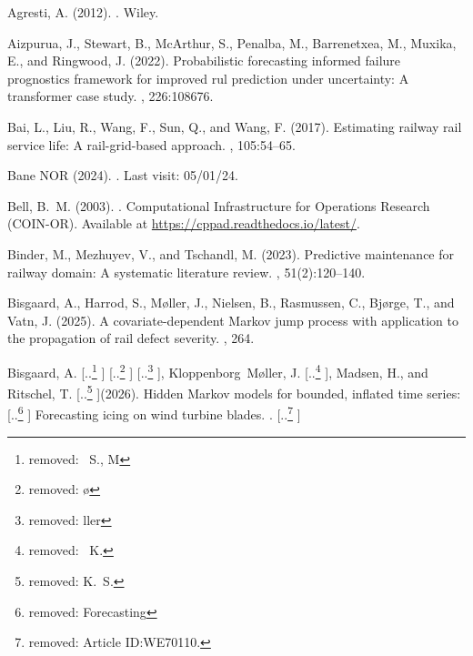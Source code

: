 \documentclass{article}
\providecommand{\DIFadd}[1]{{\protect\color{blue} \sf #1}} %
\providecommand{\DIFdel}[1]{{\protect\color{red} [..\footnote{removed: #1} ]}} %
\providecommand{\DIFaddbegin}{} %
\providecommand{\DIFaddend}{} %
\providecommand{\DIFdelbegin}{} %
\providecommand{\DIFdelend}{} %
\begin{document}
\begin{thebibliography}{}

Agresti, A. (2012).
.
\newblock Wiley.

Aizpurua, J., Stewart, B., McArthur, S., Penalba, M., Barrenetxea, M., Muxika,
  E., and Ringwood, J. (2022).
\newblock Probabilistic forecasting informed failure prognostics framework for
  improved rul prediction under uncertainty: A transformer case study.
, 226:108676.

Bai, L., Liu, R., Wang, F., Sun, Q., and Wang, F. (2017).
\newblock Estimating railway rail service life: A rail-grid-based approach.
,
  105:54--65.

{Bane NOR} (2024).
.
\newblock Last visit: 05/01/24.

Bell, B.~M. (2003).
.
\newblock Computational Infrastructure for Operations Research (COIN-OR).
\newblock Available at \url{https://cppad.readthedocs.io/latest/}.

Binder, M., Mezhuyev, V., and Tschandl, M. (2023).
\newblock Predictive maintenance for railway domain: A systematic literature
  review.
, 51(2):120--140.

Bisgaard, A., Harrod, S., M{\o}ller, J., Nielsen, B., Rasmussen, C., Bj{\o}rge,
  T., and Vatn, J. (2025).
\newblock A covariate-dependent {Markov} jump process with application to the
  propagation of rail defect severity.
, 264.

Bisgaard, A.\DIFdelbegin \DIFdel{~S., M}%
\DIFdel{\o}%
\DIFdel{ller}\DIFdelend , \DIFaddbegin \DIFadd{Kloppenborg Møller, }\DIFaddend J.\DIFdelbegin \DIFdel{~K.}\DIFdelend , Madsen, H., and Ritschel, T. \DIFdelbegin \DIFdel{K.~S. }\DIFdelend (2026).
\newblock Hidden {Markov} models for bounded, inflated time series:
  \DIFdelbegin \DIFdel{Forecasting
  }\DIFdelend \DIFaddbegin {\DIFadd{Forecasting}} \DIFaddend icing on wind turbine blades.
\newblock {\em Wind Energy}\DIFaddbegin \DIFadd{, 29(5):e70110}\DIFaddend .
\DIFdelbegin %
\DIFdel{Article ID:WE70110.
}\DIFdelend 


\end{thebibliography}
\end{document}
